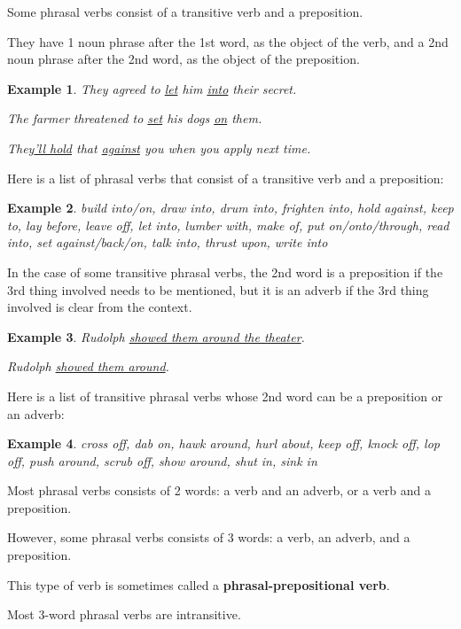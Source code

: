 \documentclass[oneside]{book}
\numberwithin{equation}{section}
\newtheorem{example}{Example}[section]
\begin{document}
%
\noindent{} Some phrasal verbs consist of a transitive verb and a preposition.

They have 1 noun phrase after the 1st word, as the object of the verb, and a 2nd noun phrase after the 2nd word, as the object of the preposition.
\begin{example}
    They agreed to \underline{let} him \underline{into} their secret.
    
    The farmer threatened to \underline{set} his dogs \underline{on} them.
    
    They\underline{'ll hold} that \underline{against} you when you apply next time.
\end{example}
%
\noindent{} Here is a list of phrasal verbs that consist of a transitive verb and a preposition:
\begin{example}
    build into/on, draw into, drum into, frighten into, hold against, keep to, lay before, leave off, let into, lumber with, make of, put on/onto/through, read into, set against/back/on, talk into, thrust upon, write into
\end{example}
%
\noindent{} In the case of some transitive phrasal verbs, the 2nd word is a preposition if the 3rd thing involved needs to be mentioned, but it is an adverb if the 3rd thing involved is clear from the context.
\begin{example}
    Rudolph \underline{showed them around the theater}.
    
    Rudolph \underline{showed them around}.
\end{example}
%
\noindent{} Here is a list of transitive phrasal verbs whose 2nd word can be a preposition or an adverb:
\begin{example}
    cross off, dab on, hawk around, hurl about, keep off, knock off, lop off, push around, scrub off, show around, shut in, sink in
\end{example}
%
\noindent{} Most phrasal verbs consists of 2 words: a verb and an adverb, or a verb and a preposition.

However, some phrasal verbs consists of 3 words: a verb, an adverb, and a preposition.

This type of verb is sometimes called a \textbf{phrasal-prepositional verb}.

%
Most 3-word phrasal verbs are intransitive.
\end{document}

